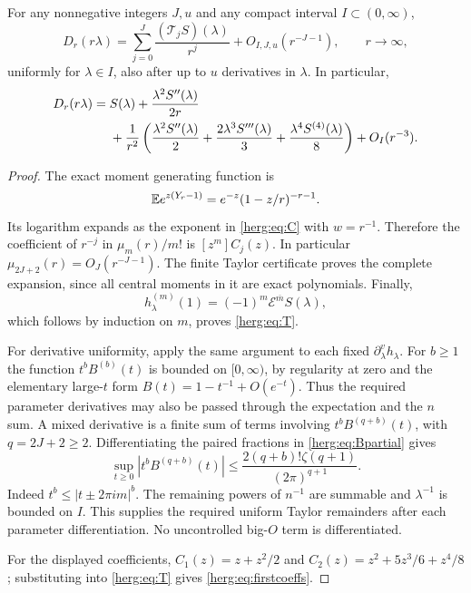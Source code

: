 \begin{theorem}
\label{herg:thm:expansion}
For any nonnegative integers $J,u$ and any compact interval
$I\subset(0,\infty)$,
\begin{equation}\label{herg:eq:expansion}
 D_r(r\lambda)=\sum_{j=0}^J\frac{(\mathcal T_jS)(\lambda)}{r^j}
                +O_{I,J,u}(r^{-J-1}),\qquad r\longrightarrow\infty,
\end{equation}
uniformly for $\lambda\in I$, also after up to $u$ derivatives in
$\lambda$. In particular,
\begin{align}
 D_r(r\lambda)={}&S(\lambda)
  +\frac{\lambda^2S''(\lambda)}{2r}\label{herg:eq:firstcoeffs}\\
 &+\frac1{r^2}
 \left(\frac{\lambda^2S''(\lambda)}2
       +\frac{2\lambda^3S'''(\lambda)}3
       +\frac{\lambda^4S^{(4)}(\lambda)}8\right)+O_I(r^{-3}).\notag
\end{align}
\end{theorem}
\begin{proof}
The exact moment generating function is
\[
 \mathbb E e^{z(Y_r-1)}=e^{-z}(1-z/r)^{-r-1}.
\]
Its logarithm expands as the exponent in \eqref{herg:eq:C} with
$w=r^{-1}$. Therefore the coefficient of $r^{-j}$ in
$\mu_m(r)/m!$ is $[z^m]C_j(z)$. In particular
$\mu_{2J+2}(r)=O_J(r^{-J-1})$. The finite Taylor certificate proves
the complete expansion, since all central moments in it are exact
polynomials. Finally,
\[
 h_\lambda^{(m)}(1)=(-1)^m\mathcal E^{\overline m}S(\lambda),
\]
which follows by induction on $m$, proves \eqref{herg:eq:T}.

For derivative uniformity, apply the same argument to each fixed
$\partial_\lambda^v h_\lambda$. For $b\geq1$ the function
$t^bB^{(b)}(t)$ is bounded on $[0,\infty)$, by regularity at zero
and the elementary large-$t$ form $B(t)=1-t^{-1}+O(e^{-t})$.
Thus the required parameter derivatives may also be passed through
the expectation and the $n$ sum. A mixed derivative is a finite sum
of terms involving $t^bB^{(q+b)}(t)$, with $q=2J+2\geq2$.
Differentiating the paired fractions in \eqref{herg:eq:Bpartial} gives
\[
 \sup_{t\geq0}|t^b B^{(q+b)}(t)|
 \leq\frac{2(q+b)!\zeta(q+1)}{(2\pi)^{q+1}}.
\]
Indeed $t^b\leq|t\pm2\pi im|^b$. The remaining powers of
$n^{-1}$ are summable and $\lambda^{-1}$ is bounded on $I$.
This supplies the required uniform Taylor remainders after each
parameter differentiation. No uncontrolled big-$O$ term is differentiated.

For the displayed coefficients,
$C_1(z)=z+z^2/2$ and
$C_2(z)=z^2+5z^3/6+z^4/8$; substituting into
\eqref{herg:eq:T} gives \eqref{herg:eq:firstcoeffs}.
\end{proof}

